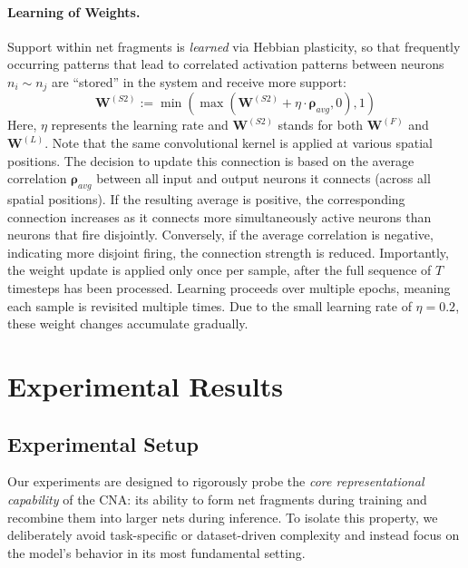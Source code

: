 \documentclass[12pt]{article}
\begin{document}
\paragraph{ Learning of Weights.}
Support within net fragments is \emph{learned} via Hebbian plasticity, so that frequently occurring patterns that lead to correlated activation patterns between neurons $n_i \sim n_j$ are ``stored'' in the system and receive more support:
%
\begin{equation}
    \boldsymbol{W}^{(S2)} := \min \left( \max \left( \boldsymbol{W}^{(S2)} + \eta \cdot \boldsymbol{\rho}_{avg}, 0\right), 1\right)
    \label{eq:hebbian_plasticity}
\end{equation}
%
Here, $\eta$ represents the learning rate and $\boldsymbol{W}^{(S2)}$ stands for both $\boldsymbol{W}^{(F)}$ and $\boldsymbol{W}^{(L)}$.
Note that the same convolutional kernel is applied at various spatial positions. The decision to update this connection is based on the average correlation $\boldsymbol{\rho}_{avg}$ between all input and output neurons it connects (across all spatial positions).
If the resulting average is positive, the corresponding connection increases as it connects more simultaneously active neurons than neurons that fire disjointly. Conversely, if the average correlation is negative, indicating more disjoint firing, the connection strength is reduced.
Importantly, the weight update is applied only once per sample, after the full sequence of $T$ timesteps has been processed. Learning proceeds over multiple epochs, meaning each sample is revisited multiple times. Due to the small learning rate of $\eta=0.2$, these weight changes accumulate gradually.

\section{Experimental Results}\label{sec:exp_results}

\subsection{Experimental Setup}\label{sec:exp_setting}
Our experiments are designed to rigorously probe the \emph{core representational capability} of the CNA: its ability to form net fragments during training and recombine them into larger nets during inference. To isolate this property, we deliberately avoid task-specific or dataset-driven complexity and instead focus on the model’s behavior in its most fundamental setting.
\end{document}
